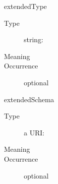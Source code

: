 \documentclass[11pt,a4paper]{ivoa}
\begin{document}
\begin{generated}
\begin{bigdescription}
\begin{description}
\end{description}
\item[extendedType]
\begin{description}
\item[Type] string: 
\item[Meaning] 
\item[Occurrence] optional
\end{description}
\item[extendedSchema]
\begin{description}
\item[Type] a URI: 
\item[Meaning] 
\item[Occurrence] optional
\end{description}


\end{bigdescription}\endgroup

\endgroup
\end{generated}

\end{document}
